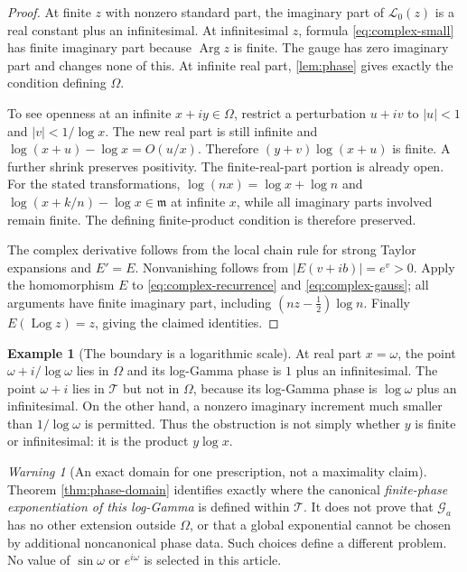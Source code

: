 \documentclass[11pt,letterpaper]{article}
\numberwithin{equation}{section}
\theoremstyle{plain}
\theoremstyle{definition}
\newtheorem{example}[example]{Example}
\theoremstyle{remark}
\newtheorem{warning}[warning]{Warning}
\newcommand{\mi}{\mathfrak m}
\newcommand{\Log}{\operatorname{Log}}
\newcommand{\abs}[1]{\lvert#1\rvert}
\newcommand{\tube}{\mathcal T}
\newcommand{\Lt}{\mathcal L}
\newcommand{\Gt}{\mathcal G}
\begin{document}
\begin{proof}
At finite $z$ with nonzero standard part, the imaginary part of $\Lt_0(z)$
is a real constant plus an infinitesimal. At infinitesimal $z$, formula
\eqref{eq:complex-small} has finite imaginary part because $\operatorname{Arg}z$
is finite. The gauge has zero imaginary part and changes none of this.
At infinite real part,
\cref{lem:phase} gives exactly the condition defining $\Omega$.

To see openness at an infinite $x+iy\in\Omega$, restrict a perturbation
$u+iv$ to $\abs u<1$ and $\abs v<1/\log x$. The new real part is still
infinite and
$\log(x+u)-\log x=O(u/x)$. Therefore
$(y+v)\log(x+u)$ is finite. A further shrink preserves positivity.
The finite-real-part portion is already open. For the stated transformations,
$\log(nx)=\log x+\log n$ and
$\log(x+k/n)-\log x\in\mi$ at infinite $x$, while all imaginary
parts involved remain finite. The defining finite-product condition is
therefore preserved.

The complex derivative follows from the local chain rule for strong Taylor
expansions and $E'=E$. Nonvanishing follows from
$\abs{E(v+ib)}=e^v>0$. Apply the homomorphism $E$ to
\eqref{eq:complex-recurrence} and \eqref{eq:complex-gauss}; all arguments
have finite imaginary part, including $(nz-\tfrac12)\log n$.
Finally $E(\Log z)=z$, giving the claimed identities.
\end{proof}

\begin{example}[The boundary is a logarithmic scale]
At real part $x=\omega$, the point
$\omega+i/\log\omega$ lies in $\Omega$ and its log-Gamma phase is
$1$ plus an infinitesimal. The point $\omega+i$ lies in $\tube$ but not
in $\Omega$, because its log-Gamma phase is $\log\omega$ plus an
infinitesimal. On the other hand, a nonzero imaginary increment much smaller
than $1/\log\omega$ is permitted. Thus the obstruction is not simply
whether $y$ is finite or infinitesimal: it is the product $y\log x$.
\end{example}

\begin{warning}[An exact domain for one prescription, not a maximality claim]
Theorem \ref{thm:phase-domain} identifies exactly where the canonical
\emph{finite-phase exponentiation of this log-Gamma} is defined within
$\tube$. It does not prove that $\Gt_a$ has no other extension outside
$\Omega$, or that a global exponential cannot be chosen by additional
noncanonical phase data. Such choices define a different problem. No
value of $\sin\omega$ or $e^{i\omega}$ is selected in this article.
\end{warning}
\end{document}
